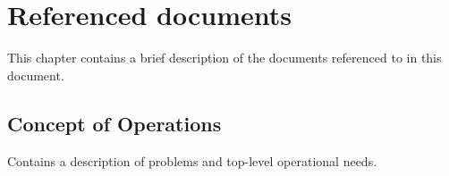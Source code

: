 \chapter{Referenced documents}
This chapter contains a brief description of the documents referenced to in this document.

\section{Concept of Operations}
Contains a description of problems and top-level operational needs.

